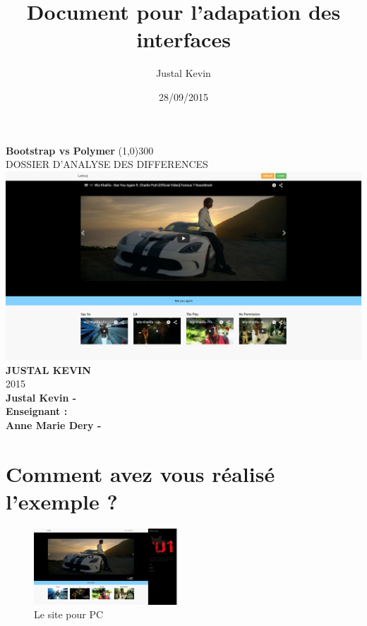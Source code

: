 \documentclass{article}
\title{Document pour l'adapation des interfaces}
\author{Justal Kevin}
\date{28/09/2015}
\begin{document}
\begin{center}
\textbf{\Huge{Bootstrap vs Polymer}}
\line(1,0){300}\\
DOSSIER D'ANALYSE DES DIFFERENCES\\
\vspace{3cm}
\includegraphics[width=1.0\textwidth]{pc}\\
\vspace{3cm}
\textbf{\Large{JUSTAL KEVIN}}\\
2015\\
\vspace{2cm}
\textbf{Justal Kevin -  \color{black}{- SI5 - IHM}}\\
\vspace{4cm}
\textbf{Enseignant :}\\
\textbf{Anne Marie Dery - }
\end{center}

\newpage
\newpage
\tableofcontents

\newpage

\section{Comment avez vous r\'ealis\'e l'exemple ?}

\begin{figure}
  \vspace{-20pt}
  \begin{center}
    \includegraphics[width=0.48\textwidth]{p2}
  \end{center}
  \vspace{-20pt}
  \caption{Le site pour PC}
  \vspace{-10pt}
\end{figure}
\end{document}
